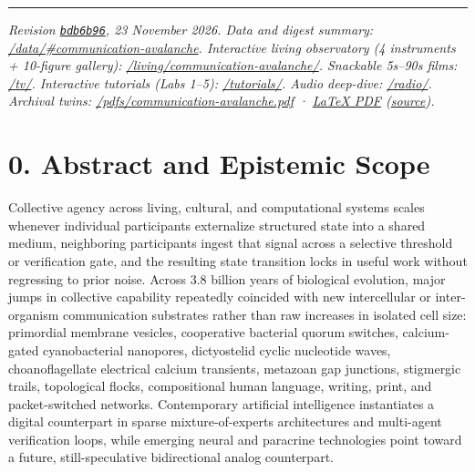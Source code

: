 \documentclass[10pt,letterpaper]{article}
\begin{document}
{
\small
\setcounter{tocdepth}{2}
\tableofcontents
}
\vspace{4pt}
\hrule
\vspace{8pt}

\emph{Revision
\href{https://github.com/openIE-dev/research-openie-web/commits/main/src/content/papers/communication-avalanche.md}{\texttt{bdb6b96}},
23 November 2026. Data and digest summary:
\href{https://research.openie.dev/data/\#communication-avalanche}{/data/\#communication-avalanche}.
Interactive living observatory (4 instruments + 10-figure gallery):
\href{https://research.openie.dev/living/communication-avalanche/}{/living/communication-avalanche/}.
Snackable 5s--90s films: \href{https://research.openie.dev/tv/}{/tv/}.
Interactive tutorials (Labs 1--5):
\href{https://research.openie.dev/tutorials/}{/tutorials/}. Audio
deep-dive: \href{https://research.openie.dev/radio/}{/radio/}. Archival
twins:
\href{https://research.openie.dev/pdfs/communication-avalanche.pdf}{/pdfs/communication-avalanche.pdf}
·
\href{https://research.openie.dev/pdfs/latex/communication-avalanche.pdf}{LaTeX
PDF}
(\href{https://research.openie.dev/pdfs/latex/communication-avalanche.tex}{source}).}

\section{0. Abstract and Epistemic
Scope}\label{abstract-and-epistemic-scope}

Collective agency across living, cultural, and computational systems
scales whenever individual participants externalize structured state
into a shared medium, neighboring participants ingest that signal across
a selective threshold or verification gate, and the resulting state
transition locks in useful work without regressing to prior noise.
Across 3.8 billion years of biological evolution, major jumps in
collective capability repeatedly coincided with new intercellular or
inter-organism communication substrates rather than raw increases in
isolated cell size: primordial membrane vesicles, cooperative bacterial
quorum switches, calcium-gated cyanobacterial nanopores, dictyostelid
cyclic nucleotide waves, choanoflagellate electrical calcium transients,
metazoan gap junctions, stigmergic trails, topological flocks,
compositional human language, writing, print, and packet-switched
networks. Contemporary artificial intelligence instantiates a digital
counterpart in sparse mixture-of-experts architectures and multi-agent
verification loops, while emerging neural and paracrine technologies
point toward a future, still-speculative bidirectional analog
counterpart.
\end{document}

